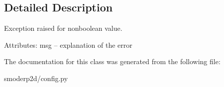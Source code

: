 \subsection{Detailed Description}
\begin{DoxyVerb}Exception raised for nonboolean value.

Attributes:
    msg  -- explanation of the error
\end{DoxyVerb}
 

The documentation for this class was generated from the following file\-:\begin{DoxyCompactItemize}
\item 
smoderp2d/config.\-py\end{DoxyCompactItemize}
